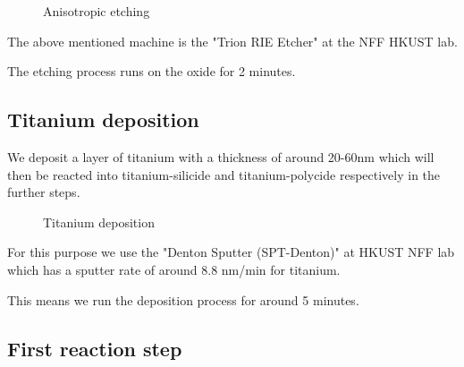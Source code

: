 \begin{figure}[H]
	\centering
	\begin{tikzpicture}[node distance = 3cm, auto, thick,scale=\CrossSectionOnly, every node/.style={transform shape}]
		
	\end{tikzpicture}
	\begin{tikzpicture}[node distance = 3cm, auto, thick,scale=\CrossSectionOnly, every node/.style={transform shape}]
		
	\end{tikzpicture}
	\caption{Anisotropic etching}
\end{figure}

The above mentioned machine is the "Trion RIE Etcher" at the NFF HKUST lab.

The etching process runs on the oxide for 2 minutes.

\subsection{Titanium deposition}

We deposit a layer of titanium with a thickness of around 20-60nm which will then be reacted into titanium-silicide and titanium-polycide respectively in the further steps.

\begin{figure}[H]
	\centering
	\begin{tikzpicture}[node distance = 3cm, auto, thick,scale=\CrossSectionOnly, every node/.style={transform shape}]
		
	\end{tikzpicture}
	\drawStepArrow{}
	\begin{tikzpicture}[node distance = 3cm, auto, thick,scale=\CrossSectionOnly, every node/.style={transform shape}]
		
	\end{tikzpicture}
	\caption{Titanium deposition}
\end{figure}

For this purpose we use the "Denton Sputter (SPT-Denton)" at HKUST NFF lab which has a sputter rate of around 8.8 nm/min for titanium.

This means we run the deposition process for around 5 minutes.

\subsection{First reaction step}

